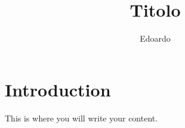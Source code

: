 \documentclass{article}
\title{Titolo}
\author{Edoardo}
\begin{document}
\maketitle{}
\section{Introduction}
This is where you will write your content.
\end{document}
